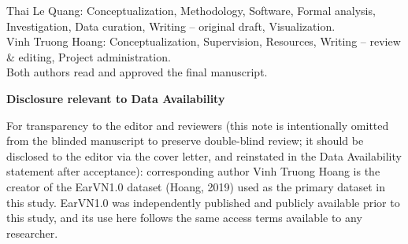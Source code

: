 \documentclass[11pt]{article}
\begin{document}
\vspace{2mm}
\noindent Thai Le Quang: Conceptualization, Methodology, Software, Formal analysis, Investigation, Data curation, Writing -- original draft, Visualization.\\
Vinh Truong Hoang: Conceptualization, Supervision, Resources, Writing -- review \& editing, Project administration.\\
Both authors read and approved the final manuscript.

\vspace{4mm}
\noindent\textbf{Disclosure relevant to Data Availability}

\vspace{2mm}
\noindent For transparency to the editor and reviewers (this note is intentionally omitted from the blinded manuscript to preserve double-blind review; it should be disclosed to the editor via the cover letter, and reinstated in the Data Availability statement after acceptance): corresponding author Vinh Truong Hoang is the creator of the EarVN1.0 dataset (Hoang, 2019) used as the primary dataset in this study. EarVN1.0 was independently published and publicly available prior to this study, and its use here follows the same access terms available to any researcher.
\end{document}
